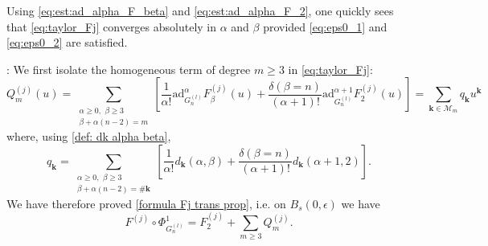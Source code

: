 \documentclass[a4paper,10pt,reqno]{article}
\theoremstyle{definition}
\theoremstyle{plain}
\theoremstyle{plain}
\theoremstyle{definition}
\theoremstyle{plain}
\theoremstyle{plain}
\theoremstyle{plain}
\theoremstyle{definition}
\theoremstyle{definition}
\newcommand{\norm}[1]{\left\lVert #1 \right\rVert}
\def \M{\mathcal{M}}
\def \k{\bm{k}}
\begin{document}
Using \eqref{eq:est:ad_alpha_F_beta} and \eqref{eq:est:ad_alpha_F_2}, one quickly sees that \eqref{eq:taylor_Fj} converges absolutely in $\alpha$ and $\beta$ provided \eqref{eq:eps0_1} and \eqref{eq:eps0_2} are satisfied.


\medskip

: We first isolate the homogeneous term of degree $m \ge 3$ in \eqref{eq:taylor_Fj}:
\[
Q_m^{(j)}(u) = \sum_{ \substack{ \alpha \ge 0, \, \, \beta \ge 3 \\ \beta + \alpha(n-2) = m} } \left [ \frac{1}{\alpha !} \mathrm{ad}_{G_n^{(l)}}^{\alpha} F_{\beta}^{(j)}(u) + \frac{\delta(\beta=n)}{(\alpha+1)!} \mathrm{ad}_{G_n^{(l)}}^{\alpha+1} F_2^{(j)}(u) \right ] = \sum_{\k \in \M_m} q_{\k} u^{\k}
\]
where, using \eqref{def: dk alpha beta},
\begin{equation}\label{eq: formula q}
q_{\k} = \sum_{\substack{ \alpha \ge 0, \, \, \beta \ge 3 \\ \beta + \alpha(n-2) = \#\k}} \left [ \frac{1}{\alpha !} d_{\k}(\alpha,\beta) + \frac{\delta(\beta=n)}{(\alpha+1)!} d_{\k}(\alpha+1,2) \right ].
\end{equation}
We have therefore proved \eqref{formula Fj trans prop}, i.e. on  $B_s(0,\epsilon)$ we have
\[
F^{(j)} \circ \Phi_{G_n^{(l)}}^1 = F_2^{(j)} + \sum_{m \ge 3} Q_m^{(j)}.
\]
\end{document}

